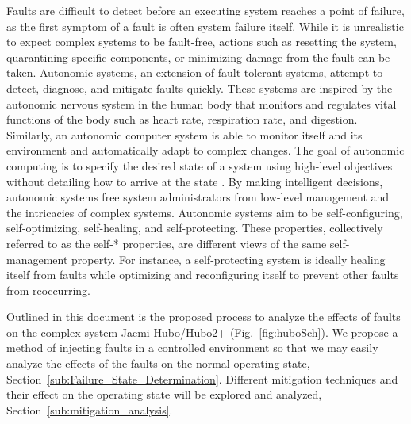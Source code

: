 Faults are difficult to detect before an executing system reaches a point of failure, as the first symptom of a fault is often system failure itself. While it is unrealistic to expect complex systems to be fault-free, actions such as resetting the system, quarantining specific components, or minimizing damage from the fault can be taken. Autonomic systems, an extension of fault tolerant systems, attempt to detect, diagnose, and mitigate faults quickly. These systems are inspired by the autonomic nervous system in the human body that monitors and regulates vital  functions of the body such as heart rate, respiration rate, and digestion. Similarly, an autonomic computer system is able to monitor itself and its environment and automatically adapt to complex changes. The goal of autonomic computing is to specify the desired state of a system using high-level objectives without detailing how to arrive at the state \cite{1160055,4061119,1301340}. By making intelligent decisions, autonomic systems free system administrators from low-level management and the intricacies of complex systems. Autonomic systems aim to be self-configuring, self-optimizing, self-healing, and self-protecting. These properties, collectively referred to as the self-* properties, are different views of the same self-man\-age\-ment property. For instance, a self-protecting system is ideally healing itself from faults while optimizing and reconfiguring itself to prevent other faults from reoccurring.

Outlined in this document is the proposed process to analyze the effects of faults on the complex system Jaemi Hubo/Hubo2+ (Fig.~\ref{fig:huboSch}).  We propose a method of injecting faults in a controlled environment so that we may easily analyze the effects of the faults on the normal operating state, Section~\ref{sub:Failure_State_Determination}.  Different mitigation techniques and their effect on the operating state will be explored and analyzed, Section~\ref{sub:mitigation_analysis}.

